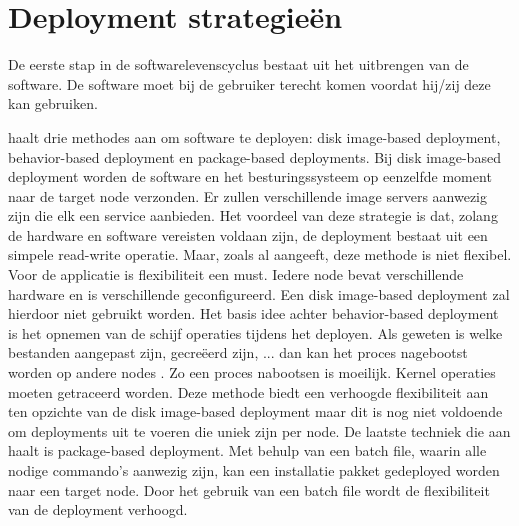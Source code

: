 \section{Deployment strategieën}\label{sec:deployment}
De eerste stap in de softwarelevenscyclus bestaat uit het uitbrengen van de software.
De software moet bij de gebruiker terecht komen voordat hij/zij deze kan gebruiken.

\citet{deploymentMethods} haalt drie methodes aan om software te deployen: disk image-based deployment, behavior-based deployment en package-based deployments.
Bij disk image-based deployment worden de software en het besturingssysteem op eenzelfde moment naar de target node verzonden.
Er zullen verschillende image servers aanwezig zijn die elk een service aanbieden.
Het voordeel van deze strategie is dat, zolang de hardware en software vereisten voldaan zijn, de deployment bestaat uit een simpele read-write operatie.
Maar, zoals \citet{deploymentMethods} al aangeeft, deze methode is niet flexibel.
Voor de applicatie is flexibiliteit een must.
Iedere node bevat verschillende hardware en is verschillende geconfigureerd.
Een disk image-based deployment zal hierdoor niet gebruikt worden.
Het basis idee achter behavior-based deployment is het opnemen van de schijf operaties tijdens het deployen.
Als geweten is welke bestanden aangepast zijn, gecreëerd zijn, ... dan kan het proces nagebootst worden op andere nodes \citep{deploymentMethods}.
Zo een proces nabootsen is moeilijk.
Kernel operaties moeten getraceerd worden.
Deze methode biedt een verhoogde flexibiliteit aan ten opzichte van de disk image-based deployment maar dit is nog niet voldoende om deployments uit te voeren die uniek zijn per node.
De laatste techniek die \citet{deploymentMethods} aan haalt is package-based deployment.
Met behulp van een batch file, waarin alle nodige commando's aanwezig zijn, kan een installatie pakket gedeployed worden naar een target node.
Door het gebruik van een batch file wordt de flexibiliteit van de deployment verhoogd.

